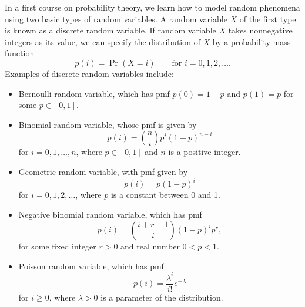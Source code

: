 In a first course on probability theory, we learn how to model random phenomena using two basic types of random variables. A random variable $X$ of the first type is known as a discrete random variable. If random variable $X$ takes nonnegative integers as its value, we can specify the distribution of $X$ by a probability mass function
\[
p(i)=\Pr(X=i) \qquad \text{for } i=0,1,2,\dots.
\]
Examples of discrete random variables include:
\begin{itemize}
    \item Bernoulli random variable, which has pmf $p(0)=1-p$ and $p(1)=p$ for some $p\in [0,1]$.
    \item Binomial random variable, whose pmf is given by
    \[
    p(i)=\binom{n}{i}p^i(1-p)^{n-i}
    \]
    for $i=0,1,\dots,n$, where $p\in [0,1]$ and $n$ is a positive integer.
    \item Geometric random variable, with pmf given by
    \[
    p(i)=p(1-p)^i
    \]
    for $i=0,1,2,\dots$, where $p$ is a constant between 0 and 1.
    \item Negative binomial random variable, which has pmf
    \[
    p(i)=\binom{i+r-1}{i}(1-p)^i p^r,
    \]
    for some fixed integer $r>0$ and real number $0<p<1$.
    \item Poisson random variable, which has pmf
    \[
    p(i)=\frac{\lambda^i}{i!}e^{-\lambda}
    \]
    for $i\ge 0$, where $\lambda>0$ is a parameter of the distribution.
\end{itemize}

